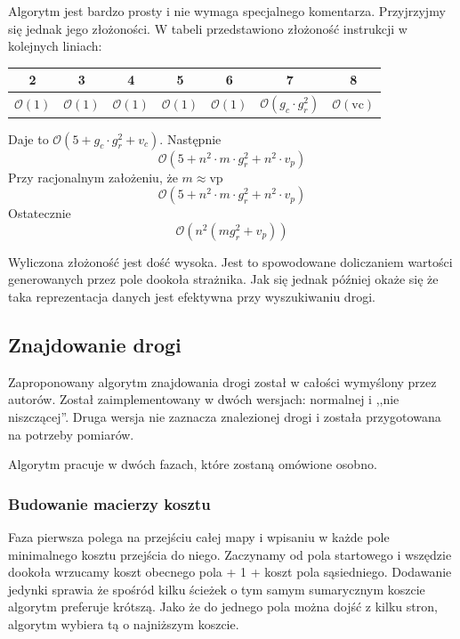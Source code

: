 \documentclass[12pt]{article}
\begin{document}
Algorytm jest bardzo prosty i nie wymaga specjalnego komentarza. Przyjrzyjmy się jednak jego złożoności. W tabeli przedstawiono złożoność instrukcji w kolejnych liniach:
\begin{tabular}{|c|c|c|c|c|c|c|}
\hline 
2 & 3 & 4 & 5 & 6 & 7 & 8 \\ 
\hline 
$\mathcal{O}(1)$ & $\mathcal{O}(1)$ & $\mathcal{O}(1)$ & $\mathcal{O}(1)$ & $\mathcal{O}(1)$ & $\mathcal{O}(g_c \cdot g_r^2)$ & $\mathcal{O}(\text{vc})$ \\ 
\hline 
\end{tabular} 
Daje to $\mathcal{O}(5 + g_c \cdot g_r^2 + v_c )$. Następnie 
\begin{equation*}
\mathcal{O} \left(
5 + n^2 \cdot m \cdot g_r^2 + n^2 \cdot v_p
 \right)
\end{equation*}
Przy racjonalnym założeniu, że $m \approx \text{vp}$
\begin{equation*}
\mathcal{O} \left(
5 + n^2 \cdot m \cdot g_r^2 + n^2 \cdot v_p
\right)
\end{equation*}
Ostatecznie
\begin{equation*}
\mathcal{O}\left(n^2( m g_r^2 + v_p ) \right)
\end{equation*}

Wyliczona złożoność jest dość wysoka. Jest to spowodowane doliczaniem wartości generowanych przez pole dookoła strażnika. Jak się jednak później okaże się że taka reprezentacja danych jest efektywna przy wyszukiwaniu drogi.


\subsection{Znajdowanie drogi}

Zaproponowany algorytm znajdowania drogi został w całości wymyślony przez autorów. Został zaimplementowany w dwóch wersjach: normalnej i ,,nie niszczącej''. Druga wersja nie zaznacza znalezionej drogi i została przygotowana na potrzeby pomiarów.

Algorytm pracuje w dwóch fazach, które zostaną omówione osobno.

\subsubsection{Budowanie macierzy kosztu}
Faza pierwsza polega na przejściu całej mapy i wpisaniu w każde pole minimalnego kosztu przejścia do niego. Zaczynamy od pola startowego i wszędzie dookoła wrzucamy koszt obecnego pola + 1 + koszt pola sąsiedniego. Dodawanie jedynki sprawia że spośród kilku ścieżek o tym samym sumarycznym koszcie algorytm preferuje krótszą. Jako że do jednego pola można dojść z kilku stron, algorytm wybiera tą o najniższym koszcie.
\end{document}

